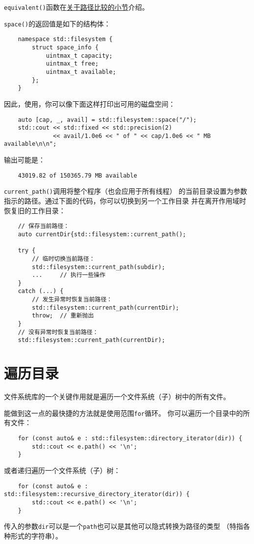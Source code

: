 \texttt{equivalent()}函数在\hyperref[ch20.3.6]{关于路径比较的小节}介绍。

\texttt{space()}的返回值是如下的结构体：
\begin{lstlisting}
    namespace std::filesystem {
        struct space_info {
            uintmax_t capacity;
            uintmax_t free;
            uintmax_t available;
        };
    }
\end{lstlisting}
因此，使用，你可以像下面这样打印出可用的磁盘空间：
\begin{lstlisting}
    auto [cap, _, avail] = std::filesystem::space("/");
    std::cout << std::fixed << std::precision(2)
              << avail/1.0e6 << " of " << cap/1.0e6 << " MB available\n\n";
\end{lstlisting}
输出可能是：
\begin{lstlisting}
    43019.82 of 150365.79 MB available
\end{lstlisting}
\texttt{current\_path()}调用将整个程序（也会应用于所有线程）
的当前目录设置为参数指示的路径。通过下面的代码，你可以切换到另一个工作目录
并在离开作用域时恢复旧的工作目录：
\begin{lstlisting}
    // 保存当前路径：
    auto currentDir{std::filesystem::current_path();

    try {
        // 临时切换当前路径：
        std::filesystem::current_path(subdir);
        ...     // 执行一些操作
    }
    catch (...) {
        // 发生异常时恢复当前路径：
        std::filesystem::current_path(currentDir);
        throw;  // 重新抛出
    }
    // 没有异常时恢复当前路径：
    std::filesystem::current_path(currentDir);
\end{lstlisting}


\section{遍历目录}\label{ch20.5}
文件系统库的一个关键作用就是遍历一个文件系统（子）树中的所有文件。

能做到这一点的最快捷的方法就是使用范围\texttt{for}循环。
你可以遍历一个目录中的所有文件：
\begin{lstlisting}
    for (const auto& e : std::filesystem::directory_iterator(dir)) {
        std::cout << e.path() << '\n';
    }
\end{lstlisting}
或者递归遍历一个文件系统（子）树：
\begin{lstlisting}
    for (const auto& e : std::filesystem::recursive_directory_iterator(dir)) {
        std::cout << e.path() << '\n';
    }
\end{lstlisting}
传入的参数\texttt{dir}可以是一个\texttt{path}也可以是其他可以隐式转换为路径的类型
（特指各种形式的字符串）。\label{遍历.}

